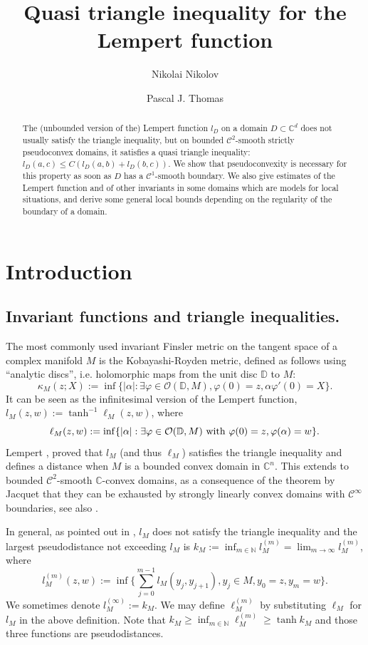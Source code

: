 \documentclass[a4paper,12pt]{amsart}
\title{Quasi triangle inequality for the Lempert function}
\author{Nikolai Nikolov}
\author{Pascal J. Thomas}
\def\D{\mathbb D}
\def\C{\mathbb C}
\def\N{\mathbb N}
\begin{document}

\begin{abstract}
The (unbounded version of the) Lempert function $l_D$ on a domain $D\subset \C^d$
does not usually satisfy the triangle inequality, but on
bounded $\mathcal C^2$-smooth strictly pseudoconvex domains, it satisfies a quasi triangle inequality:
$l_D(a,c)\le C( l_D(a,b)+l_D(b,c))$. We show that pseudoconvexity is necessary for this property
as soon as $D$ has a $\mathcal C^1$-smooth boundary. 
We also give  estimates of the Lempert function and of other invariants in some
domains which are models for local situations, 
and derive some general local bounds
depending on the regularity of the boundary of a domain.
\end{abstract}

\maketitle

\section{Introduction}
\subsection{Invariant functions and triangle inequalities.}

The most commonly used invariant Finsler metric on the tangent space of a complex manifold $M$
is the Kobayashi-Royden metric, defined as follows using ``analytic discs'', i.e.
holomorphic maps from the unit disc $\D$ to $M$:
$$
\kappa_M(z;X):=\inf\{|\alpha| :\exists\varphi\in\mathcal O(\D,M), \varphi(0)=z, \alpha\varphi'(0)=X\}.
$$
It can be seen \cite{NP} as the infinitesimal version of the Lempert function,
$l_M(z,w):=\tanh^{-1}\ell_M(z,w)$, where
$$
\ell_M(z,w):=\inf\{|\alpha|:\exists\varphi\in\mathcal O(\D,M)
\hbox{ with }\varphi(0)=z,\varphi(\alpha)=w\}.
$$
Lempert \cite{L1}, \cite{L2} proved that $l_M$ (and thus $\ell_M$) satisfies the triangle inequality and defines a distance
when $M$ is a bounded convex domain in $\C^n$. This  extends to bounded $\mathcal C^2$-smooth $\C$-convex domains,
as a consequence of the theorem by Jacquet
\cite{Jq} that they can be exhausted by strongly linearly convex domains with $\mathcal C^\infty$ boundaries,
see also \cite[Remark 7.1.21 (b)]{JP}.

In general, as pointed out in \cite{L1}, $l_M$ does not satisfy the triangle inequality and
the largest pseudodistance not exceeding $l_M$ is $k_M:=\inf_{m\in\N}l_M^{(m)}= \lim_{m\to\infty}l_M^{(m)}$, where
\[
l_M^{(m)}(z,w) := \inf\{\sum_{j=0}^{m-1} l_M(y_j,y_{j+1}) , y_j \in M, y_0=z, y_m=w \} .
\]
We sometimes denote $l_M^{(\infty)}:=k_M$. 
We may define $\ell_M^{(m)}$ by substituting $\ell_M$
for $l_M$ in the above definition.
Note that $k_M \ge \inf_{m\in\N}\ell_M^{(m)}\ge \tanh k_M$ 
and those three functions  are pseudodistances.
\end{document}
